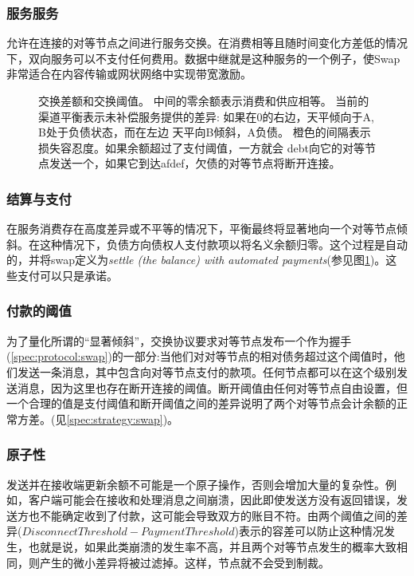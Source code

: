 \subsubsection{服务服务}

允许在连接的对等节点之间进行服务交换。在消费相等且随时间变化方差低的情况下，双向服务可以不支付任何费用。数据中继就是这种服务的一个例子，使Swap非常适合在内容传输或网状网络中实现带宽激励。

\begin{figure}[htbp]

\caption[交换差额和交换阈值\statusgreen]{交换差额和交换阈值。
中间的零余额表示消费和供应相等。
当前的渠道平衡表示未补偿服务提供的差异:
如果在0的右边，天平倾向于A, B处于负债状态，而在左边
天平向B倾斜，A负债。
橙色的间隔表示损失容忍度。如果余额超过了支付阈值，一方就会
debt向它的对等节点发送一个，如果它到达afdef，欠债的对等节点将断开连接。}
\label{fig:swap}
\end{figure}

\subsubsection{结算与支付}

在服务消费存在高度差异或不平等的情况下，平衡最终将显著地向一个对等节点倾斜。在这种情况下，负债方向债权人支付款项以将名义余额归零。这个过程是自动的，并将swap定义为\emph{settle (the balance) with automated payments}(参见图\ref{fig:swap})。这些支付可以只是承诺。


\subsubsection{付款的阈值}

为了量化所谓的“显著倾斜”，交换协议要求对等节点发布一个作为握手(\ref{spec:protocol:swap})的一部分:当他们对对等节点的相对债务超过这个阈值时，他们发送一条消息，其中包含向对等节点支付的款项。任何节点都可以在这个级别发送消息，因为这里也存在断开连接的阈值。断开阈值由任何对等节点自由设置，但一个合理的值是支付阈值和断开阈值之间的差异说明了两个对等节点会计余额的正常方差。(见\ref{spec:strategy:swap})。 


\subsubsection{原子性}

发送并在接收端更新余额不可能是一个原子操作，否则会增加大量的复杂性。例如，客户端可能会在接收和处理消息之间崩溃，因此即使发送方没有返回错误，发送方也不能确定收到了付款，这可能会导致双方的账目不符。由两个阈值之间的差异($\mathit{DisconnectThreshold}-\mathit{PaymentThreshold}$)表示的容差可以防止这种情况发生，也就是说，如果此类崩溃的发生率不高，并且两个对等节点发生的概率大致相同，则产生的微小差异将被过滤掉。这样，节点就不会受到制裁。

